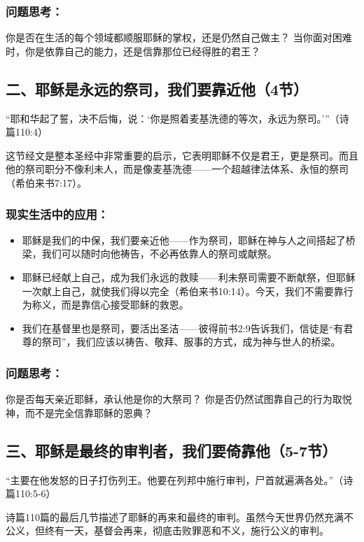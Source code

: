 \documentclass[a4paper, 12pt]{article}
\begin{document}
\subsubsection*{问题思考：}

你是否在生活的每个领域都顺服耶稣的掌权，还是仍然自己做主？
当你面对困难时，你是依靠自己的能力，还是信靠那位已经得胜的君王？
\subsection*{二、耶稣是永远的祭司，我们要靠近他（4节）}
“耶和华起了誓，决不后悔，说：‘你是照着麦基洗德的等次，永远为祭司。’”（诗篇110:4）

这节经文是整本圣经中非常重要的启示，它表明耶稣不仅是君王，更是祭司。而且他的祭司职分不像利未人，而是像麦基洗德——一个超越律法体系、永恒的祭司（希伯来书7:17）。

\subsubsection*{现实生活中的应用：}
\begin{itemize}
    \item 耶稣是我们的中保，我们要亲近他——作为祭司，耶稣在神与人之间搭起了桥梁，我们可以随时向他祷告，不必再依靠人的祭司或献祭。

    \item 耶稣已经献上自己，成为我们永远的救赎——利未祭司需要不断献祭，但耶稣一次献上自己，就使我们得以完全（希伯来书10:14）。今天，我们不需要靠行为称义，而是靠信心接受耶稣的救恩。

    \item 我们在基督里也是祭司，要活出圣洁——彼得前书2:9告诉我们，信徒是“有君尊的祭司”，我们应该以祷告、敬拜、服事的方式，成为神与世人的桥梁。

\end{itemize}
\subsubsection*{问题思考：}

你是否每天亲近耶稣，承认他是你的大祭司？
你是否仍然试图靠自己的行为取悦神，而不是完全信靠耶稣的恩典？
\subsection*{三、耶稣是最终的审判者，我们要倚靠他（5-7节）}
“主要在他发怒的日子打伤列王。他要在列邦中施行审判，尸首就遍满各处。”（诗篇110:5-6）

诗篇110篇的最后几节描述了耶稣的再来和最终的审判。虽然今天世界仍然充满不公义，但终有一天，基督会再来，彻底击败罪恶和不义，施行公义的审判。
\end{document}
